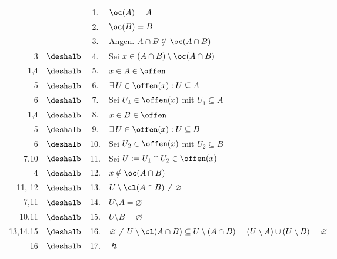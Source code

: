     \begin{longtable}{r c c l}
        & & 1. & $\oc(A) = A$ \\
        & & 2. & $\oc(B) = B$ \\
        & & 3. & Angen. $A \cap B \nsubseteq \oc(A \cap B)$ \\
        3 & $\deshalb$ & 4. & Sei $x \in (A \cap B) \setminus \oc(A \cap B)$ \\
        1,4 & $\deshalb$ & 5. & $x \in A \in \offen$  \\
        5 & $\deshalb$ & 6. & $\exists\: U \in \offen(x) : U \subseteq A$  \\
        6 & $\deshalb$ & 7. & Sei $U_1 \in \offen(x)$ mit $U_1 \subseteq A$  \\
        1,4 & $\deshalb$ & 8. & $x \in B \in \offen$  \\
        5 & $\deshalb$ & 9. & $\exists\: U \in \offen(x) : U \subseteq B$  \\
        6 & $\deshalb$ & 10. & Sei $U_2 \in \offen(x)$ mit $U_2 \subseteq B$  \\
        7,10 & $\deshalb$ & 11. & Sei $U := U_1 \cap U_2 \in \offen(x)$ \\
        4 & $\deshalb$ & 12. & $x \notin \oc(A \cap B)$  \\
        11, 12 & $\deshalb$ & 13. & $U \setminus \cl(A \cap B) \neq \varnothing$  \\
        7,11 & $\deshalb$ & 14. & $U \setminus A = \varnothing$  \\
        10,11 & $\deshalb$ & 15. & $U \setminus B = \varnothing$  \\
        13,14,15 & $\deshalb$ & 16. & $\varnothing \neq U \setminus \cl(A \cap B) \subseteq U \setminus (A \cap B) = (U \setminus A) \cup (U \setminus B) = \varnothing$  \\
        16 & $\deshalb$ & 17. & $\lightning$  \\
    \end{longtable}
    
    

    

    

